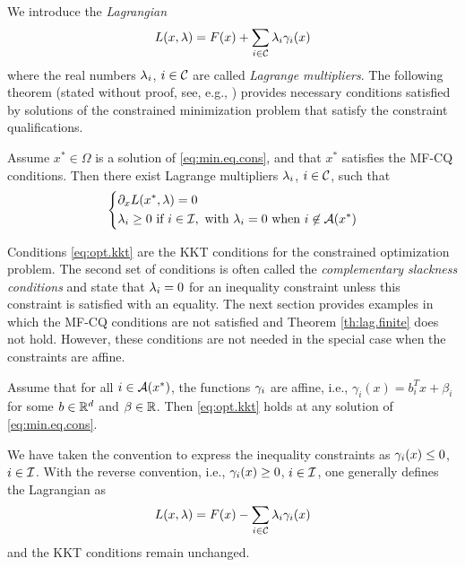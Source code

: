 We introduce the {\em Lagrangian}
\begin{equation}
\label{eq:lag}
L(x, \lambda) = F(x) + \sum_{i\in {\mathcal C}} \lambda_i \gamma_i(x)
\end{equation}
where the real numbers $\lambda_i$, $ i\in {\mathcal C}$ are called {\em Lagrange multipliers}.
The following theorem (stated without proof, see, e.g., \citep{nocedal2006nonlinear,bonnans2006numerical}) provides necessary conditions satisfied by solutions of the constrained minimization problem that satisfy the constraint qualifications. 
\begin{theorem}
\label{th:lag.finite}
Assume $x^*\in \Omega$ is a solution of \cref{eq:min.eq.cons}, and that $x^*$ satisfies the MF-CQ conditions. Then there exist Lagrange multipliers $\lambda_i$, $i\in {\mathcal C}$, such that
\begin{equation}
\label{eq:opt.kkt}
\left\{
\begin{aligned}
&\partial_x L(x^*, \lambda)  = 0\\
&\lambda_i \geq 0 \text{ if } i \in {\mathcal I}, \text{ with } \lambda_i = 0 \text{ when } i\not\in {\mathcal A}(x^*) 
\end{aligned}
\right.
\end{equation}
\end{theorem}
Conditions \eqref{eq:opt.kkt} are the KKT conditions for the constrained optimization problem. The second set of conditions is often called the {\em complementary slackness conditions} and state that $\lambda_i = 0$ for an inequality constraint unless this constraint is satisfied with an equality. The next section provides examples in which the MF-CQ conditions are not satisfied and Theorem \ref{th:lag.finite} does not hold. However, these conditions are not needed in the special case when the constraints are affine.
\begin{theorem}
\label{th:lag.finite.aff}
Assume that for all $i\in {\mathcal A}(x^*)$, the functions $\gamma_i$ are affine, i.e., $\gamma_i(x) = b_i^T x + \beta_i$ for some $b\in {\mathbb{R}}^d$ and $\beta\in {\mathbb{R}}$.  Then \cref{eq:opt.kkt} holds at any solution of \cref{eq:min.eq.cons}.
\end{theorem}

\begin{remark}
\label{rem:positive.const}
We have taken the convention to express the inequality constraints as $\gamma_i(x)\leq 0$, $i\in{\mathcal I}$. With the reverse convention, i.e., $\gamma_i(x)\geq 0$, $i\in{\mathcal I}$, one generally defines the Lagrangian as
\[
L(x, \lambda) = F(x) - \sum_{i\in {\mathcal C}} \lambda_i \gamma_i(x)
\]
and the KKT conditions remain unchanged.
\end{remark}


